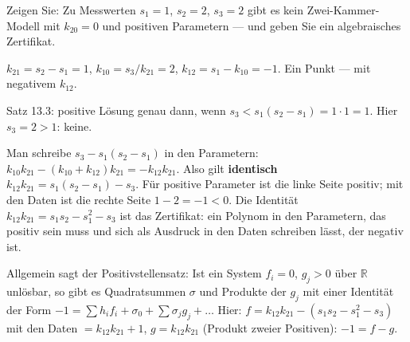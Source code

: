 \begin{aufgabe}
Zeigen Sie: Zu Messwerten $s_1 = 1$, $s_2 = 2$, $s_3 = 2$ gibt es kein Zwei-Kammer-Modell mit $k_{20} = 0$ und positiven Parametern --- und geben Sie ein algebraisches Zertifikat.

\loesung
{}
$k_{21} = s_2 - s_1 = 1$, $k_{10} = s_3/k_{21} = 2$, $k_{12} = s_1 - k_{10} = -1$. Ein Punkt --- mit negativem $k_{12}$.

Satz 13.3: positive Lösung genau dann, wenn $s_3 < s_1(s_2 - s_1) = 1\cdot1 = 1$. Hier $s_3 = 2 > 1$: keine.

Man schreibe $s_3 - s_1(s_2 - s_1)$ in den Parametern: $k_{10}k_{21} - (k_{10} + k_{12})k_{21} = -k_{12}k_{21}$. Also gilt \textbf{identisch} $k_{12}k_{21} = s_1(s_2 - s_1) - s_3$. Für positive Parameter ist die linke Seite positiv; mit den Daten ist die rechte Seite $1 - 2 = -1 < 0$. Die Identität $k_{12}k_{21} = s_1s_2 - s_1^{2} - s_3$ ist das Zertifikat: ein Polynom in den Parametern, das positiv sein muss und sich als Ausdruck in den Daten schreiben lässt, der negativ ist.

Allgemein sagt der Positivstellensatz: Ist ein System $f_i = 0$, $g_j > 0$ über $\mathbb R$ unlösbar, so gibt es Quadratsummen $\sigma$ und Produkte der $g_j$ mit einer Identität der Form $-1 = \sum h_if_i + \sigma_0 + \sum\sigma_jg_j + \ldots$ Hier: $f = k_{12}k_{21} - (s_1s_2 - s_1^{2} - s_3)$ mit den Daten $= k_{12}k_{21} + 1$, $g = k_{12}k_{21}$ (Produkt zweier Positiven): $-1 = f - g$. \checkmark

\begin{center}
\begin{minipage}{0.88\textwidth}
\end{minipage}
\end{center}
\end{aufgabe}

